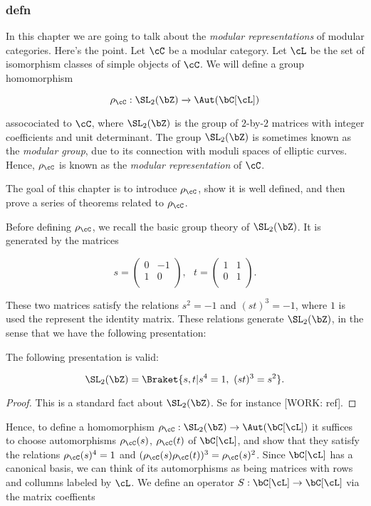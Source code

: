 \subsubsection{defn}

In this chapter we are going to talk about the \textit{modular representations} of modular categories. Here's the point. Let $\cC$ be a modular category. Let $\cL$ be the set of isomorphism classes of simple objects of $\cC$. We will define a group homomorphism

$$\rho_{\cC}:\SL_2(\bZ)\xrightarrow{}\Aut(\bC[\cL])$$

assocociated to $\cC$, where $\SL_2(\bZ)$ is the group of $2$-by-$2$ matrices with integer coefficients and unit determinant. The group $\SL_2(\bZ)$ is sometimes known as the \textit{modular group}, due to its connection with moduli spaces of elliptic curves. Hence, $\rho_{\cC}$ is known as the \textit{modular representation} of $\cC$.

The goal of this chapter is to introduce $\rho_{\cC}$, show it is well defined, and then prove a series of theorems related to $\rho_{\cC}$.

Before defining $\rho_{\cC}$, we recall the basic group theory of $\SL_2(\bZ)$. It is generated by the matrices

$$
s=
\begin{pmatrix}
0 & -1 \\
1 & 0 \\
\end{pmatrix},
\,\,\,\,
t=
\begin{pmatrix}
1 & 1 \\
0 & 1 \\
\end{pmatrix}.
$$

These two matrices satisfy the relations $s^2=-1$ and $(st)^3=-1$, where $1$ is used the represent the identity matrix. These relations generate $\SL_2(\bZ)$, in the sense that we have the following presentation:

\begin{prop} The following presentation is valid:

$$\SL_2(\bZ)=\Braket{s,t | s^4=1,\,\, (st)^3=s^2}.$$
\end{prop}
\begin{proof} This is a standard fact about $\SL_2(\bZ)$. Se for instance [WORK: ref].
\end{proof}

Hence, to define a homomorphism $\rho_{\cC}:\SL_2(\bZ)\to \Aut(\bC[\cL])$ it suffices to choose automorphisms $\rho_{\cC}(s)$, $\rho_{\cC}(t)$ of $\bC[\cL]$, and show that they satisfy the relations $\rho_{\cC}(s)^4=1$ and $(\rho_{\cC}(s)\rho_{\cC}(t))^3=\rho_{\cC}(s)^2$. Since $\bC[\cL]$ has a canonical basis, we can think of its automorphisms as being matrices with rows and collumns labeled by $\cL$. We define an operator $S:\bC[\cL]\to \bC[\cL]$ via the matrix coeffients

